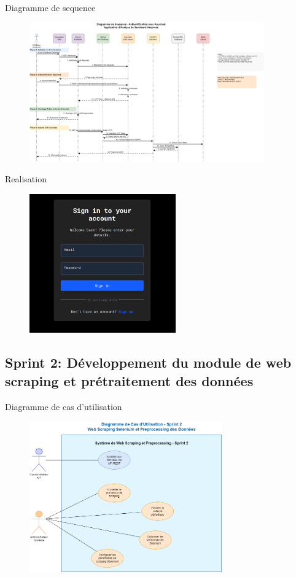 \begin{frame}{Diagramme de sequence}
    \begin{figure}[H]
        \centering
        \includegraphics[height=6cm]{assets/images/sprint1-sequence.png}
    \end{figure}
\end{frame}

\begin{frame}{Realisation}
    \begin{figure}[H]
        \centering
        \includegraphics[height=6cm]{assets/images/signin-ui.png}
    \end{figure}
\end{frame}


\subsection{Sprint 2: Développement du module de web scraping et prétraitement des données}
\begin{frame}{Diagramme de cas d'utilisation}

    \begin{figure}[H]
        \centering
        \includegraphics[height=6.5cm]{assets/images/sprint2-usecase.png}
    \end{figure}
\end{frame}


